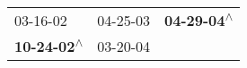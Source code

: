 \begin{supertabular}{lll}
                  03-16-02\textsuperscript{} &  04-25-03\textsuperscript{} &  \textbf{04-29-04\textsuperscript{$\wedge$}} \\
 \textbf{10-24-02\textsuperscript{$\wedge$}} &  03-20-04\textsuperscript{} &                                              \\
\end{supertabular}
